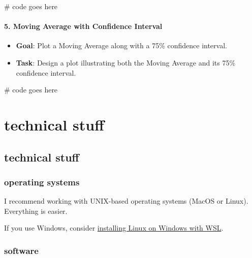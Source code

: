 \documentclass[
  letterpaper,
  DIV=11,
  numbers=noendperiod,
  oneside]{scrreprt}
\newenvironment{Shaded}{\begin{snugshade}}{\end{snugshade}}
\newcommand{\CommentTok}[1]{\textcolor[rgb]{0.37,0.37,0.37}{#1}}
\providecommand{\tightlist}{%
  \setlength{\itemsep}{0pt}\setlength{\parskip}{0pt}}\usepackage{longtable,booktabs,array}
\begin{document}
\begin{Shaded}
\begin{Highlighting}[]
\CommentTok{\# code goes here}
\end{Highlighting}
\end{Shaded}

\hypertarget{moving-average-with-confidence-interval}{%
\subsection{5. Moving Average with Confidence
Interval}\label{moving-average-with-confidence-interval}}

\begin{itemize}
\tightlist
\item
  \textbf{Goal}: Plot a Moving Average along with a 75\% confidence
  interval.
\item
  \textbf{Task}: Design a plot illustrating both the Moving Average and
  its 75\% confidence interval.
\end{itemize}

\begin{Shaded}
\begin{Highlighting}[]
\CommentTok{\# code goes here}
\end{Highlighting}
\end{Shaded}

\part{technical stuff}

\hypertarget{technical-stuff-1}{%
\chapter{technical stuff}\label{technical-stuff-1}}

\hypertarget{operating-systems}{%
\section{operating systems}\label{operating-systems}}

I recommend working with UNIX-based operating systems (MacOS or Linux).
Everything is easier.

If you use Windows, consider
\href{https://learn.microsoft.com/en-us/windows/wsl/install}{installing
Linux on Windows with WSL}.

\hypertarget{software}{%
\section{software}\label{software}}
\end{document}
